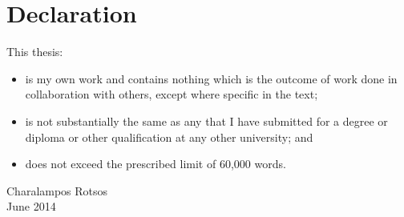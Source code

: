 \chapter*{Declaration}

This thesis:
\begin{itemize}
    \item is my own work and contains nothing which is the outcome of work done
        in collaboration with others, except where specific in the text; 

    \item is not substantially the same as any that I have submitted for a
        degree or diploma or other qualification at any other university; and 
   
    \item does not exceed the prescribed limit of 60,000 words.
\end{itemize}

\begin{flushright}
Charalampos Rotsos\\June 2014
\end{flushright}
